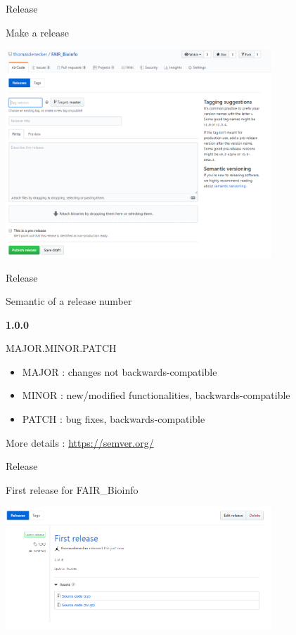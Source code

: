 \begin{frame}{Release}

Make a release

\begin{center}
    \includegraphics[width=10cm]{08_sharing/images/github_new_release.png}
\end{center}

\end{frame}

\begin{frame}{Release}

Semantic of a release number

\begin{center}
    \textbf{1.0.0}
    
    MAJOR.MINOR.PATCH
    
\end{center}
\par
\begin{itemize}
    \item MAJOR : changes not backwards-compatible
    \item MINOR : new/modified functionalities, backwards-compatible
    \item PATCH : bug fixes, backwards-compatible
\end{itemize}

More details : \url{https://semver.org/}
\end{frame}

\begin{frame}{Release}

First release for FAIR\_Bioinfo

\begin{center}
    \includegraphics[width=10cm]{08_sharing/images/github_first_release.png}
\end{center}

\end{frame}

